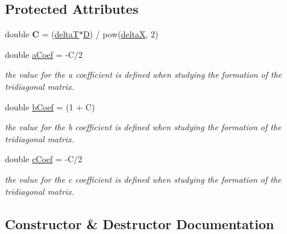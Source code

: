 \subsection*{Protected Attributes}
\begin{DoxyCompactItemize}
\item 
\mbox{\label{class_crank_nicholson_method_a69b00d4201a7e55cd3fc1d28d1fa1dc2}} 
double {\bfseries C} = (\hyperlink{class_solution_a116a08a1a8793618fb5269016cfd9b61}{deltaT}$\ast$\hyperlink{class_solution_af647b9b893549259060034672babb0f8}{D}) / pow(\hyperlink{class_solution_a8e97e5534ddcde31983432b8fb2050ff}{deltaX}, 2)
\item 
\mbox{\label{class_crank_nicholson_method_a1977a47d86e7b30eec5b57600144e23e}} 
double \hyperlink{class_crank_nicholson_method_a1977a47d86e7b30eec5b57600144e23e}{a\+Coef} = -\/C/2
\begin{DoxyCompactList}\small\item\em the value for the a coefficient is defined when studying the formation of the tridiagonal matrix. \end{DoxyCompactList}\item 
\mbox{\label{class_crank_nicholson_method_ad22f33a10cbad33f62347bc2a19a79f7}} 
double \hyperlink{class_crank_nicholson_method_ad22f33a10cbad33f62347bc2a19a79f7}{b\+Coef} = (1 + C)
\begin{DoxyCompactList}\small\item\em the value for the b coefficient is defined when studying the formation of the tridiagonal matrix. \end{DoxyCompactList}\item 
\mbox{\label{class_crank_nicholson_method_a34b9d53c9347389c48b7d68b7eefbad7}} 
double \hyperlink{class_crank_nicholson_method_a34b9d53c9347389c48b7d68b7eefbad7}{c\+Coef} = -\/C/2
\begin{DoxyCompactList}\small\item\em the value for the c coefficient is defined when studying the formation of the tridiagonal matrix. \end{DoxyCompactList}\end{DoxyCompactItemize}


\subsection{Constructor \& Destructor Documentation}
\mbox{\label{class_crank_nicholson_method_ae5052444cd3f042a554bb74d9ac556e0}} 
